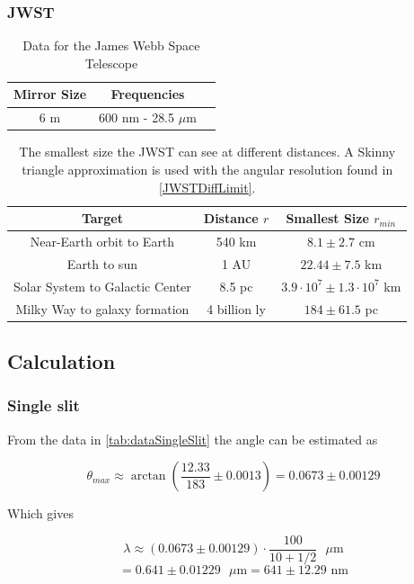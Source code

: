\documentclass{emulateapj}
\begin{document}
\subsubsection{JWST}
\begin{table}[H]
\centering
\begin{tabular}{ c c c }
Mirror Size & Frequencies \\
\hline
6 m & 600 nm - 28.5 $\mu$m 
\end{tabular}
\caption{Data for the James Webb Space Telescope}
\end{table}\label{tab:dataJWST}

\begin{table}[H]
\centering
\begin{tabular}{ c c c }
Target & Distance $r$ & Smallest Size $r_{min}$ \\
\hline
Near-Earth orbit to Earth & 540 km &$8.1 \pm 2.7$ cm \\
Earth to sun & 1 AU & $22.44 \pm 7.5$ km \\
Solar System to Galactic Center & 8.5 pc & $3.9\cdot 10^7 \pm 1.3\cdot 10^7$ km \\
Milky Way to galaxy formation &  4 billion ly & $184 \pm 61.5$ pc 
\end{tabular}
\caption{The smallest size the JWST can see at different distances. A Skinny triangle approximation is used with the angular resolution found in \eqref{JWSTDiffLimit}.}
\end{table}\label{tab:visionJWST}


\subsection{Calculation}
\subsubsection{Single slit}


From the data in \ref{tab:dataSingleSlit} the angle can be estimated as

\begin{equation}
\theta_{max} \approx \arctan\left( \frac{12.33}{183} \pm 0.0013 \right) = 0.0673 \pm 0.00129
\end{equation}

Which gives 

\begin{equation}
\lambda \approx (0.0673 \pm 0.00129) \cdot \frac{100}{10 +1/2}\text{ }\mu \text{m} 
\end{equation}
\begin{equation}
= 0.641\pm 0.01229\text{ }\mu \text{m} = 641 \pm 12.29 \text{ nm}
\end{equation}\label{eq:waveLenghtLaser}
\end{document}
